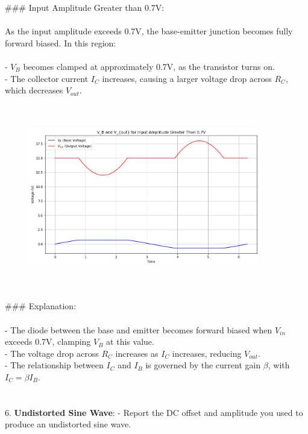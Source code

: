\documentclass{article}
\begin{document}
### Input Amplitude Greater than 0.7V: \\ \\ 
As the input amplitude exceeds 0.7V, the base-emitter junction becomes fully forward biased. In this region: \\ \\
- \( V_B \) becomes clamped at approximately 0.7V, as the transistor turns on. \\ 
- The collector current \( I_C \) increases, causing a larger voltage drop across \( R_C \), which decreases \( V_{out} \). \\
\\ \\ 

\begin{figure}[H]
    \centering
    \includegraphics[width=0.9\textwidth]{./img/Lab5_5_Above.png}
    \caption{}
    \label{fig:graph1} 
\end{figure}
\\ \\ 

### Explanation: \\ \\
- The diode between the base and emitter becomes forward biased when \( V_{in} \) exceeds 0.7V, clamping \( V_B \) at this value. \\ 
- The voltage drop across \( R_C \) increases as \( I_C \) increases, reducing \( V_{out} \). \\ 
- The relationship between \( I_C \) and \( I_B \) is governed by the current gain \( \beta \), with \( I_C = \beta I_B \). \\ 

\\ \\ 
6. \textbf{Undistorted Sine Wave}:
   - Report the DC offset and amplitude you used to produce an undistorted sine wave.
\end{document}
